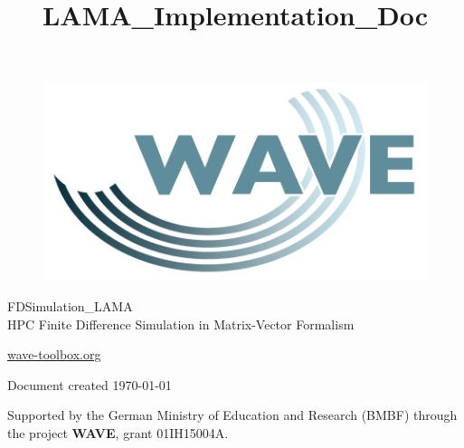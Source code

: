 \documentclass[pdftex,a4paper,parskip,listof=totoc,bibliography=totoc,onehalfspacing,12pt]{scrreprt}
\title{LAMA_Implementation_Doc}
\author{}
\begin{document}



\thispagestyle{empty} %
\begin{figure}[h] %
\begin{flushright}
\includegraphics[scale=0.15]{./images/wave_logo.png}
\end{flushright}
\end{figure}

\begin{center}
\vspace{2cm}
\huge{FDSimulation\_LAMA }\\
\vspace{0.5cm}
\large{HPC Finite Difference Simulation in Matrix-Vector Formalism}
\end{center}

\vfill
\begin{center}
{\Large{\url{wave-toolbox.org}}}


{\small Document created \today}
\end{center}

\newpage 
\thispagestyle{empty}
\begin{center}
{\large
Supported by the German Ministry of Education and Research (BMBF) through the project \textbf{WAVE}, grant 01IH15004A.
}
\end{center}

\cleardoublepage

\setcounter{page}{1}
\restoregeometry


\newpage

\tableofcontents %
\end{document}
